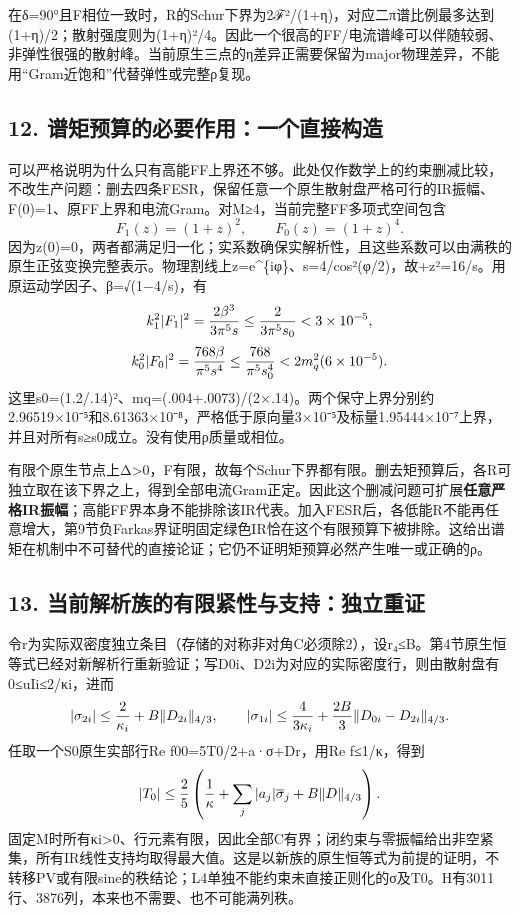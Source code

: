 \documentclass[
  11pt,
  a4paper,
]{article}
\begin{document}
在δ=90°且F相位一致时，R的Schur下界为2\textbar ℱ\textbar²/(1+η)，对应二π谱比例最多达到(1+η)/2；散射强度则为(1+η)²/4。因此一个很高的FF/电流谱峰可以伴随较弱、非弹性很强的散射峰。当前原生三点的η差异正需要保留为major物理差异，不能用``Gram近饱和''代替弹性或完整ρ复现。

\subsection{12.
谱矩预算的必要作用：一个直接构造}\label{ux8c31ux77e9ux9884ux7b97ux7684ux5fc5ux8981ux4f5cux7528ux4e00ux4e2aux76f4ux63a5ux6784ux9020}

可以严格说明为什么只有高能FF上界还不够。此处仅作数学上的约束删减比较，不改生产问题：删去四条FESR，保留任意一个原生散射盘严格可行的IR振幅、F(0)=1、原FF上界和电流Gram。对M≥4，当前完整FF多项式空间包含
\[
F_1(z)=(1+z)^2,\qquad F_0(z)=(1+z)^4.
\]
因为z(0)=0，两者都满足归一化；实系数确保实解析性，且这些系数可以由满秩的原生正弦变换完整表示。物理割线上z=e\^{}\{iφ\}、s=4/cos²(φ/2)，故+z\textbar²=16/s。用原运动学因子、β=√(1−4/s)，有
\[
k_1^2|F_1|^2={2\beta^3\over3\pi^5s}
\le{2\over3\pi^5s_0}<3\times10^{-5},
\] \[
k_0^2|F_0|^2={768\beta\over\pi^5s^4}
\le{768\over\pi^5s_0^4}<2m_q^2(6\times10^{-5}).
\]
这里s0=(1.2/.14)²、mq=(.004+.0073)/(2×.14)。两个保守上界分别约2.96519×10⁻⁵和8.61363×10⁻⁸，严格低于原向量3×10⁻⁵及标量1.95444×10⁻⁷上界，并且对所有s≥s0成立。没有使用ρ质量或相位。

有限个原生节点上Δ\textgreater0，F有限，故每个Schur下界都有限。删去矩预算后，各R可独立取在该下界之上，得到全部电流Gram正定。因此这个删减问题可扩展\textbf{任意严格IR振幅}；高能FF界本身不能排除该IR代表。加入FESR后，各低能R不能再任意增大，第9节负Farkas界证明固定绿色IR恰在这个有限预算下被排除。这给出谱矩在机制中不可替代的直接论证；它仍不证明矩预算必然产生唯一或正确的ρ。

\subsection{13.
当前解析族的有限紧性与支持：独立重证}\label{ux5f53ux524dux89e3ux6790ux65cfux7684ux6709ux9650ux7d27ux6027ux4e0eux652fux6301ux72ecux7acbux91cdux8bc1}

令r为实际双密度独立条目（存储的对称非对角C必须除2），设\textbar\textbar r\textbar\textbar₄≤B。第4节原生恒等式已经对新解析行重新验证；写D0i、D2i为对应的实际密度行，则由散射盘有0≤uIi≤2/κi，进而
\[
|\sigma_{2i}|\le {2\over\kappa_i}+B\|D_{2i}\|_{4/3},\qquad
|\sigma_{1i}|\le {4\over3\kappa_i}+{2B\over3}\|D_{0i}-D_{2i}\|_{4/3}.
\] 任取一个S0原生实部行Re f00=5T0/2+a·σ+Dr，用\textbar Re
f\textbar≤1/κ，得到 \[
|T_0|\le {2\over5}\left({1\over\kappa}+\sum_j|a_j|\overline\sigma_j+B\|D\|_{4/3}\right).
\]
固定M时所有κi\textgreater0、行元素有限，因此全部C有界；闭约束与零振幅给出非空紧集，所有IR线性支持均取得最大值。这是以新族的原生恒等式为前提的证明，不转移PV或有限sine的秩结论；L4单独不能约束未直接正则化的σ及T0。H有3011行、3876列，本来也不需要、也不可能满列秩。
\end{document}
